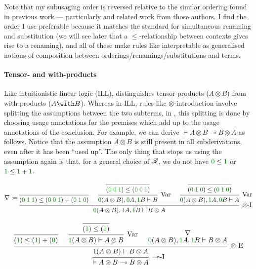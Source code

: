 Note that my subusaging order is reversed relative to the similar ordering found
in previous work --- particularly \citet{Granule18} and related work from those
authors.
I find the order I use preferable because it matches the standard for
simultaneous renaming and substitution (we will see later that a
$\leq$-relationship between contexts gives rise to a renaming), and all of these
make rules like  interpretable as generalised notions of
composition between orderings/renamings/substitutions and terms.

\paragraph{Tensor- and with-products}
Like intuitionistic linear logic (ILL), \name{} distinguishes tensor-products
($A \otimes B$) from with-products ($A \with B$).
Whereas in ILL, rules like $\otimes$-introduction involve splitting the
assumptions between the two subterms, in \name{}, this splitting is done by
choosing usage annotations for the premises which add up to the usage
annotations of the conclusion.
For example, we can derive $\vdash A \otimes B \multimap B \otimes A$ as
follows.
Notice that the assumption $A \otimes B$ is still present in all subderivations,
even after it has been ``used up''.
The only thing that stops us using the assumption again is that, for a general
choice of $\mathscr R$, we do not have $\gr0 \leq \gr1$ or $\gr1 \leq \gr1 + \gr1$.

\begin{small}
  \[
    \nabla \coloneqq
    \begin{prooftree}
      \infer0{\plr{\gr0\;\gr1\;\gr1} \leq
        \plr{\gr0\;\gr0\;\gr1} + \plr{\gr0\;\gr1\;\gr0}}
      \infer0{\plr{\gr0\;\gr0\;\gr1} \leq \plr{\gr0\;\gr0\;\gr1}}
      \infer1[Var]{\gr0\plr{A \otimes B}, \gr0A, \gr1B \vdash B}
      \infer0{\plr{\gr0\;\gr1\;\gr0} \leq \plr{\gr0\;\gr1\;\gr0}}
      \infer1[Var]{\gr0\plr{A \otimes B}, \gr1A, \gr0B \vdash A}
      \infer3[$\otimes$-I]%
      {\gr0\plr{A \otimes B}, \gr1A, \gr1B \vdash B \otimes A}
    \end{prooftree}
  \]

  \[
    \begin{prooftree}
      \infer0{\plr{\gr1} \leq \plr{\gr1} + \plr{\gr0}}
      \infer0{\plr{\gr1} \leq \plr{\gr1}}
      \infer1[Var]{\gr1\plr{A \otimes B} \vdash A \otimes B}
      \hypo{\nabla}
      \infer[no rule]1{\gr0\plr{A \otimes B}, \gr1A, \gr1B \vdash B \otimes A}
      \infer3[$\otimes$-E]{\gr1\plr{A \otimes B} \vdash B \otimes A}
      \infer1[$\multimap$-I]{\vdash A \otimes B \multimap B \otimes A}
    \end{prooftree}
  \]
\end{small}

